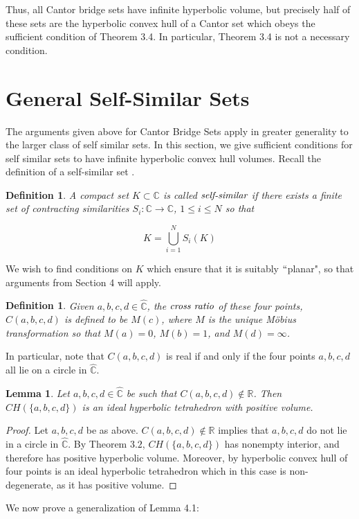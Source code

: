\documentclass[11pt]{article}
\newtheorem{lm}[tm]{Lemma}
\newtheorem{defi}[tm]{Definition}
\newcommand\comp{{\mathbb{C}}}
\begin{document}
Thus, all Cantor bridge sets have infinite hyperbolic volume, but precisely half of these sets are the hyperbolic convex hull of a Cantor set which obeys the sufficient condition of Theorem 3.4. In particular, Theorem 3.4 is not a necessary condition. 

\section{General Self-Similar Sets}

The arguments given above for Cantor Bridge Sets apply in greater generality to the larger class of self similar sets. In this section, we give sufficient conditions for self similar sets to have infinite hyperbolic convex hull volumes. Recall the definition of a self-similar set \cite{mat}.

\begin{defi}
    A compact set $K \subset \comp$ is called $\emph{self-similar}$ if there exists a finite set of contracting similarities $S_i: \comp \rightarrow \comp$, $1 \leq i \leq N$ so that 

   $$K = \bigcup_{i=1}^N S_i(K) $$
    
\end{defi}

We wish to find conditions on $K$ which ensure that it is suitably $``$planar", so that arguments from Section 4 will apply. 

\begin{defi}
    Given $a,b,c,d \in \hat{\comp}$, the $\emph{cross ratio}$ of these four points, $C(a,b,c,d)$ is defined to be $M(c)$, where $M$ is the unique M\"{o}bius transformation so that $M(a) = 0$, $M(b) = 1$, and $M(d) = \infty$. 
\end{defi}

In particular, note that $C(a,b,c,d)$ is real if and only if the four points $a,b,c,d$ all lie on a circle in $\hat{\comp}$. 

\begin{lm}
    Let $a,b,c,d \in \hat{\comp}$ be such that $C(a,b,c,d) \notin \mathbb{R}$. Then $CH(\{a,b,c,d\})$ is an ideal hyperbolic tetrahedron with positive volume. 
\end{lm}

\begin{proof} Let $a,b,c,d$ be as above. $C(a,b,c,d) \notin \mathbb{R}$ implies that $a,b,c,d$ do not lie in a circle in $\hat \comp$. By Theorem $3.2$, $CH(\{a,b,c,d\})$ has nonempty interior, and therefore has positive hyperbolic volume. Moreover, by hyperbolic convex hull of four points is an ideal hyperbolic tetrahedron which in this case is non-degenerate, as it has positive volume. 
\end{proof} 
\noindent We now prove a generalization of Lemma 4.1:
\end{document}
